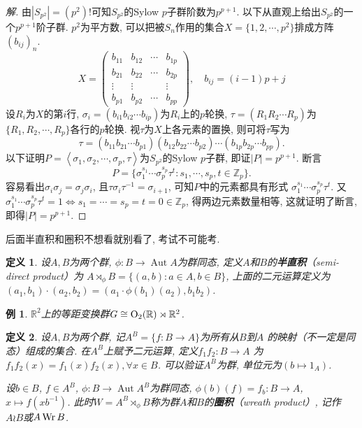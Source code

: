 \documentclass[12pt, a4paper, fontset=windows]{ctexart}
\newcommand{\R}{\mathbb{R}}
\newcommand{\Z}{\mathbb{Z}}
\newcommand{\Aut}{\operatorname{Aut}}
\newcommand{\abs}[1]{\left|{#1}\right|}
\newcommand{\gen}[1]{\left\langle{#1}\right\rangle}
\newcommand{\isom}{\cong} %
\newcommand{\kh}[1]{（{#1}）} %
\def\pmat#1{\begin{pmatrix}#1\end{pmatrix}}
\newtheorem*{definition}{定义}
\newtheorem*{example}{例}
\newenvironment{solution}{\begin{proof}[解]}{\end{proof}}
\begin{document}
\begin{solution}
由$\abs{S_{p^2}}=(p^2)!$可知$S_{p^2}$的Sylow $p$子群阶数为$p^{p+1}$. 
以下从直观上给出$S_{p^2}$的一个$p^{p+1}$阶子群. 
$p^2$为平方数, 可以把被$S_n$作用的集合$X=\{1,2,\cdots,p^2\}$排成方阵$(b_{ij})_n$. 
\[X=\pmat{b_{11}&b_{12}&\cdots&b_{1p}\\b_{21}&b_{22}&\cdots&b_{2p}\\\vdots&\vdots&&\vdots\\b_{p1}&b_{p2}&\cdots&b_{pp}},\quad b_{ij}=(i-1)p+j\]
设$R_i$为$X$的第$i$行, $\sigma_i=(b_{i1}b_{i2}\cdots b_{ip})$为$R_i$上的$p$轮换, 
$\tau=(R_1R_2\cdots R_p)$为$\{R_1,R_2,\cdots,R_p\}$各行的$p$轮换. 
视$\tau$为$X$上各元素的置换, 则可将$\tau$写为
\[\tau=(b_{11}b_{21}\cdots b_{p1})(b_{12}b_{22}\cdots b_{p2})\cdots(b_{1p}b_{2p}\cdots b_{pp}). \]
以下证明$P=\gen{\sigma_1,\sigma_2,\cdots,\sigma_p,\tau}$为$S_{p^2}$的Sylow $p$子群, 
即证$\abs{P}=p^{p+1}$. 断言
\[P=\{\sigma_1^{s_1}\cdots\sigma_p^{s_p}\tau^t:s_1,\cdots,s_p,t\in\Z_p\}. \]
容易看出$\sigma_i\sigma_j=\sigma_j\sigma_i$, 
且$\tau\sigma_i\tau^{-1}=\sigma_{i+1}$, 可知$P$中的元素都具有形式
$\sigma_1^{s_1}\cdots\sigma_p^{s_p}\tau^t$. 
又$\sigma_1^{s_1}\cdots\sigma_p^{s_p}\tau^t=1\iff s_1=\cdots=s_p=t=0\in\Z_p$, 
得两边元素数量相等, 这就证明了断言, 即得$\abs{P}=p^{p+1}$. 
\end{solution}

后面半直积和圈积不想看就别看了, 考试不可能考. 

\begin{definition}
设$A,B$为两个群, $\phi:B\to\Aut A$为群同态, 
定义$A$和$B$的{\bf 半直积}\kh{semi-direct product}为
$A\rtimes_\phi B=\{(a,b):a\in A,b\in B\}$, 
上面的二元运算定义为$(a_1,b_1)\cdot(a_2,b_2)=(a_1\cdot\phi(b_1)(a_2),b_1b_2)$. 
\end{definition}

\begin{example}
$\R^2$上的等距变换群$G\isom{\rm O}_2(\R)\rtimes\R^2$. 
\end{example}

\begin{definition}
设$A,B$为两个群, 记$A^B=\{f:B\to A\}$为所有从$B$到$A$
的映射\kh{不一定是同态}组成的集合. 在$A^B$上赋予二元运算, 定义$f_1f_2:B\to A$
为$f_1f_2(x)=f_1(x)f_2(x),\forall x\in B$. 
可以验证$A^B$为群, 单位元为$(b\mapsto 1_A)$. 

设$b\in B$, $f\in A^B$, $\phi:B\to\Aut A^B$为群同态, 
$\phi(b)(f)=f_b:B\to A$, $x\mapsto f(xb^{-1})$. 
此时$W=A^B\rtimes_\phi B$称为群$A$和$B$的{\bf 圈积}\kh{wreath product}, 
记作$A\wr B$或$A\mathop{\rm Wr}B$. 
\end{definition}
\end{document}
